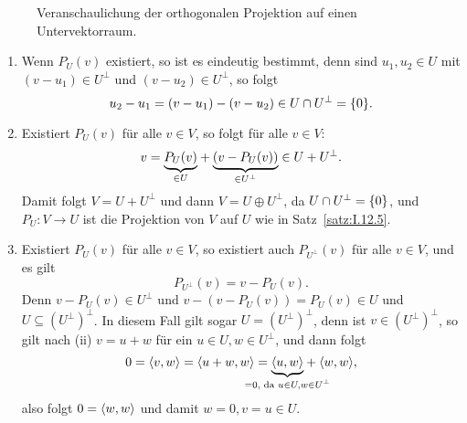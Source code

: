 \begin{figure}[h]
	\centering
	\caption{Veranschaulichung der orthogonalen Projektion auf einen Untervektorraum.}
\end{figure}

\begin{bemerkung}
	\label{bem:4.4}
	\begin{enumerate}[(1)]
		\item Wenn $P_U(v)$ existiert, so ist es eindeutig bestimmt, denn sind $u_1,u_2 \in U$ mit $(v-u_1) \in U^\perp$ und $(v-u_2) \in U^\perp$, so folgt
		\[
			u_2 - u_1 = (v-u_1) - (v-u_2) \in U \cap U^\perp = \{0\}.
		\]
		\item Existiert $P_U(v)$ für alle $v \in V$, so folgt für alle $v \in V$:
		\[
			v = {\underbrace{P_U(v)}_{\in U}} + {\underbrace{(v-P_U(v))}_{\in U^\perp}} \in U + U^\perp.
		\]
		Damit folgt $V = U+U^\perp$ und dann $V = U \oplus U^\perp$, da $U \cap U^\perp = \{0\}$, und $P_U \colon V \rightarrow U$ ist die Projektion von $V$ auf $U$ wie in Satz~\ref{satz:I.12.5}.
		\item Existiert $P_U(v)$ für alle $v \in V$, so existiert auch $P_{U^\perp}(v)$ für alle $v \in V$, und es gilt
		\[
			P_{U^\perp}(v) = v - P_U(v).
		\]
		Denn $v - P_U(v) \in U^\perp$ und $v-(v-P_U(v)) = P_U(v) \in U$ und $U \subseteq (U^\perp)^\perp$.
		In diesem Fall gilt sogar $U = (U^\perp)^\perp$, denn ist $v \in (U^\perp)^\perp$, so gilt nach (ii) $v = u+w$ für ein $u \in U, w \in U^\perp$, und dann folgt
		\[
			0 = \sk{v,w} = \sk{u+w,w} = \Underbrace{\sk{u,w}}{\mathclap{=0\text{, da } u \in U, w \in U^\perp}} + \sk{w,w},
		\]
		also folgt $0 = \left\langle w,w\right\rangle$ und damit $w = 0, v = u \in U$.
	\end{enumerate}
\end{bemerkung}

